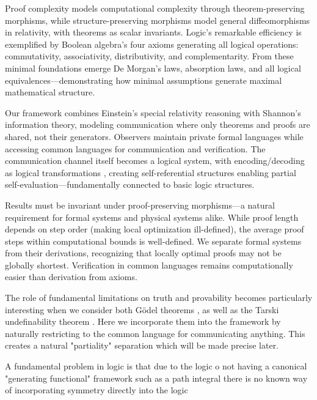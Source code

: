 Proof complexity models computational complexity through theorem-preserving morphisms, while structure-preserving morphisms model general diffeomorphisms in relativity, with theorems as scalar invariants. Logic's remarkable efficiency is exemplified by Boolean algebra's four axioms generating all logical operations: commutativity, associativity, distributivity, and complementarity. From these minimal foundations emerge De Morgan's laws, absorption laws, and all logical equivalences—demonstrating how minimal assumptions generate maximal mathematical structure. 


Our framework combines Einstein's special relativity reasoning with Shannon's information theory, modeling communication where only theorems and proofs are shared, not their generators. Observers maintain private formal languages while accessing common languages for communication and verification. The communication channel itself becomes a logical system, with encoding/decoding as logical transformations \cite{shannon1948}, creating self-referential structures enabling partial self-evaluation—fundamentally connected to basic logic structures. 


Results must be invariant under proof-preserving morphisms—a natural requirement for formal systems and physical systems alike. While proof length depends on step order (making local optimization ill-defined), the average proof steps within computational bounds is well-defined. We separate formal systems from their derivations, recognizing that locally optimal proofs may not be globally shortest. Verification in common languages remains computationally easier than derivation from axioms.


The role of fundamental limitations on truth and provability becomes particularly interesting when we consider both Gödel theorems \cite{godel1931}, as well as the Tarski undefinability theorem \cite{tarski1936}. Here we incorporate them into the framework by naturally restricting to the common language for communicating anything. This creates a natural "partiality" separation which will be made precise later. 

A fundamental problem in logic is that due to the logic o not having a canonical "generating functional" framework such as a path integral there is no known way of incorporating symmetry directly into the logic 


